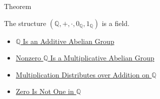 \begin{theorembox}{Theorem}
\begin{theorem}
\label{thm:q-is-a-field}
The structure $(\mathbb{Q},+,\cdot,0_{\mathbb{Q}},1_{\mathbb{Q}})$ is a field.
\end{theorem}
\end{theorembox}

\begin{dependencies}
\begin{itemize}
  \item \hyperref[thm:q-additive-abelian-group]{$\mathbb{Q}$ Is an Additive Abelian Group}
  \item \hyperref[thm:q-nonzero-multiplicative-abelian-group]{Nonzero $\mathbb{Q}$ Is a Multiplicative Abelian Group}
  \item \hyperref[thm:multiplication-distributes-over-addition-on-q]{Multiplication Distributes over Addition on $\mathbb{Q}$}
  \item \hyperref[thm:zero-not-one-in-q]{Zero Is Not One in $\mathbb{Q}$}
\end{itemize}
\end{dependencies}
